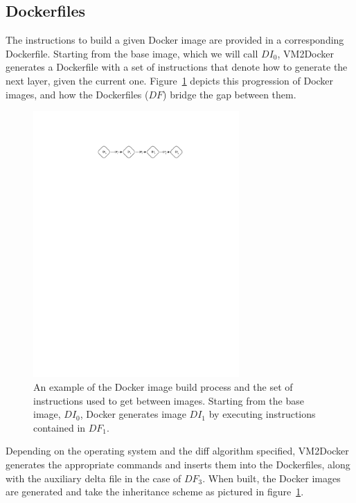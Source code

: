 \subsection{Dockerfiles}
The instructions to build a given Docker image are provided in a corresponding Dockerfile. Starting from the base image, which we will call $DI_0$, VM2Docker generates a Dockerfile with a set of instructions that denote how to generate the next layer, given the current one. Figure~\ref{fig:dockerfiles} depicts this progression of Docker images, and how the Dockerfiles ($DF$) bridge the gap between them.

\begin{figure}[h]

\centering
    \includegraphics[width=0.7\textwidth]{dockerfiles.pdf}
    \caption{An example of the Docker image build process and the set of instructions used to get between images. Starting from the base image, $DI_0$, Docker generates image $DI_1$ by executing instructions contained in $DF_1$.}
\label{fig:dockerfiles}
\end{figure}

Depending on the operating system and the diff algorithm specified, VM2Docker generates the appropriate commands and inserts them into the Dockerfiles, along with the auxiliary delta file in the case of $DF_3$. When built, the Docker images are generated and take the inheritance scheme as pictured in figure~\ref{fig:dockerfiles}.


